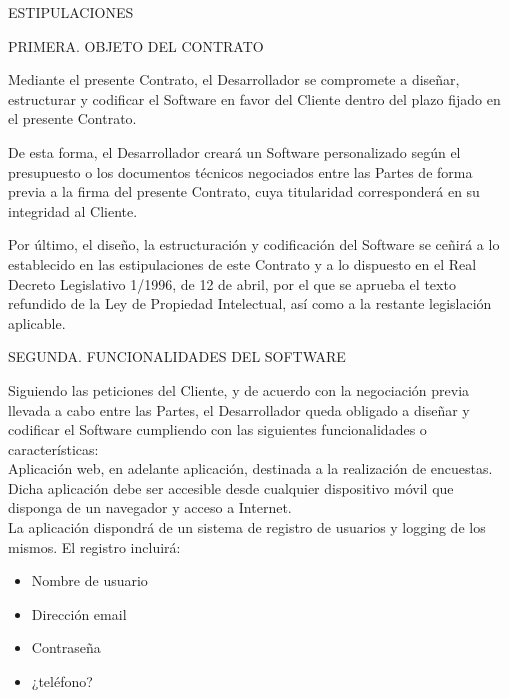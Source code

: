 \documentclass[a4paper,11pt]{report}
\begin{document}
	ESTIPULACIONES
	
	PRIMERA. OBJETO DEL CONTRATO
	
	Mediante el presente Contrato, el Desarrollador se compromete a diseñar,
	estructurar y codificar el Software en favor del Cliente dentro del
	plazo fijado en el presente Contrato.
	
	De esta forma, el Desarrollador creará un Software personalizado según
	el presupuesto o los documentos técnicos negociados entre las Partes de
	forma previa a la firma del presente Contrato, cuya titularidad
	corresponderá en su integridad al Cliente.
	
	Por último, el diseño, la estructuración y codificación del Software se
	ceñirá a lo establecido en las estipulaciones de este Contrato y a lo
	dispuesto en el Real Decreto Legislativo 1/1996, de 12 de abril, por el
	que se aprueba el texto refundido de la Ley de Propiedad Intelectual,
	así como a la restante legislación aplicable.
	
	SEGUNDA. FUNCIONALIDADES DEL SOFTWARE
	
	Siguiendo las peticiones del Cliente, y de acuerdo con la negociación
	previa llevada a cabo entre las Partes, el Desarrollador queda obligado
	a diseñar y codificar el Software cumpliendo con las siguientes
	funcionalidades o características:
	\\
	Aplicación web, en adelante aplicación, destinada a la realización de encuestas. Dicha aplicación debe ser accesible desde cualquier dispositivo móvil que disponga de un navegador y acceso a Internet.
	\\
	La aplicación dispondrá de un sistema de registro de usuarios y logging de los mismos. El registro incluirá:
	\begin{itemize}
		\item Nombre de usuario
		\item Dirección email
		\item Contraseña
		\item ¿teléfono?
	\end{itemize}
\end{document}
